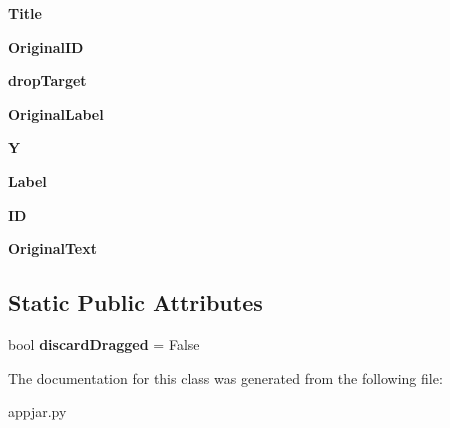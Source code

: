 \begin{DoxyCompactItemize}
{\bfseries Title}
\item 
\mbox{\label{class_python_01_g_u_i_1_1appjar_1_1_draggable_widget_a6f170f8795167cb5f0b4033fd1c5d57e}} 
{\bfseries Original\+ID}
\item 
\mbox{\label{class_python_01_g_u_i_1_1appjar_1_1_draggable_widget_a4a3b08ef1044c605441b25c6ec94b6a9}} 
{\bfseries drop\+Target}
\item 
\mbox{\label{class_python_01_g_u_i_1_1appjar_1_1_draggable_widget_a4b88403cc74542438ffc2b0040dd0323}} 
{\bfseries Original\+Label}
\item 
\mbox{\label{class_python_01_g_u_i_1_1appjar_1_1_draggable_widget_a2b3b53f644dfce3dce6514c708a9185b}} 
{\bfseries Y}
\item 
\mbox{\label{class_python_01_g_u_i_1_1appjar_1_1_draggable_widget_a0a16d6128ead27562f8ccaf29210dc5b}} 
{\bfseries Label}
\item 
\mbox{\label{class_python_01_g_u_i_1_1appjar_1_1_draggable_widget_a50b365c55fb81e465ecd9945a7d4a12c}} 
{\bfseries ID}
\item 
\mbox{\label{class_python_01_g_u_i_1_1appjar_1_1_draggable_widget_abf28c6ab6cf5ebfb914a1bd88004e07b}} 
{\bfseries Original\+Text}
\end{DoxyCompactItemize}
\subsection*{Static Public Attributes}
\begin{DoxyCompactItemize}
\item 
\mbox{\label{class_python_01_g_u_i_1_1appjar_1_1_draggable_widget_a8440e76b2761d72b628a26d54c8f5829}} 
bool {\bfseries discard\+Dragged} = False
\end{DoxyCompactItemize}


The documentation for this class was generated from the following file\+:\begin{DoxyCompactItemize}
\item 
appjar.\+py\end{DoxyCompactItemize}
